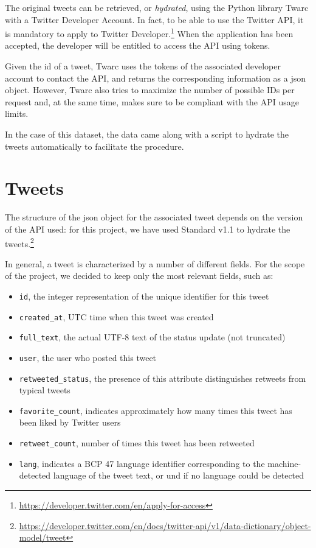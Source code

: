 The original tweets can be retrieved, or \textit{hydrated}, using the Python library Twarc with a Twitter Developer Account. In fact, to be able to use the Twitter API, it is mandatory to apply to Twitter Developer.\footnote{\url{https://developer.twitter.com/en/apply-for-access}} When the application has been accepted, the developer will be entitled to access the API using tokens. 

Given the id of a tweet, Twarc uses the tokens of the associated developer account to contact the API, and returns the corresponding information as a json object. However, Twarc also tries to maximize the number of possible IDs per request and, at the same time, makes sure to be compliant with the API usage limits.

In the case of this dataset, the data came along with a script to hydrate the tweets automatically to facilitate the procedure.

\section{Tweets}
\label{sec:tweets}
The structure of the json object for the associated tweet depends on the version of the API used: for this project, we have used Standard v1.1 to hydrate the tweets.\footnote{\url{https://developer.twitter.com/en/docs/twitter-api/v1/data-dictionary/object-model/tweet}}

In general, a tweet is characterized by a number of different fields. For the scope of the project, we decided to keep only the most relevant fields, such as:

\begin{itemize}
	\item \texttt{id}, the integer representation of the unique identifier for this tweet
	\item \texttt{created\_at}, UTC time when this tweet was created
	\item \texttt{full\_text}, the actual UTF-8 text of the status update (not truncated)
	\item \texttt{user}, the user who posted this tweet
	\item \texttt{retweeted\_status}, the presence of this attribute distinguishes retweets from typical tweets
	\item \texttt{favorite\_count}, indicates approximately how many times this tweet has been liked by Twitter users
	\item \texttt{retweet\_count}, number of times this tweet has been retweeted
	\item \texttt{lang}, indicates a BCP 47 language identifier corresponding to the machine-detected language of the tweet text, or und if no language could be detected
\end{itemize}

